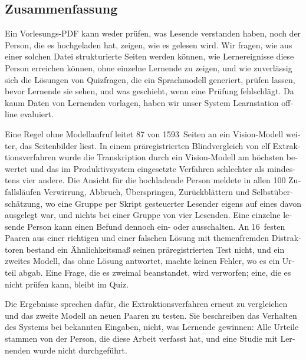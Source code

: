 \begin{otherlanguage}{ngerman}
\chapter*{Zusammenfassung}

Ein Vorlesungs-PDF kann weder prüfen, was Lesende verstanden haben, noch der
Person, die es hochgeladen hat, zeigen, wie es gelesen wird. Wir fragen, wie
aus einer solchen Datei strukturierte Seiten werden können, wie
Lernereignisse diese Person erreichen können, ohne einzelne Lernende zu
zeigen, und wie zuverlässig sich die Lösungen von Quizfragen, die ein
Sprachmodell generiert, prüfen lassen, bevor Lernende sie sehen, und was
geschieht, wenn eine Prüfung fehlschlägt. Da kaum Daten von Lernenden
vorlagen, haben wir unser System Learnstation offline evaluiert.

Eine Regel ohne Modellaufruf leitet 87 von 1593~Seiten an ein Vision-Modell
weiter, das Seitenbilder liest. In einem präregistrierten Blindvergleich von
elf Extraktionsverfahren wurde die Transkription durch ein Vision-Modell am
höchsten bewertet und das im Produktivsystem eingesetzte Verfahren schlechter
als mindestens vier andere. Die Ansicht für die hochladende Person meldete in
allen 100 Zufallsläufen Verwirrung, Abbruch, Überspringen, Zurückblättern und
Selbstüberschätzung, wo eine Gruppe per Skript gesteuerter Lesender eigens auf
eines davon ausgelegt war, und nichts bei einer Gruppe von vier Lesenden.
Eine einzelne lesende Person kann einen Befund dennoch ein- oder ausschalten.
An 16~festen Paaren aus einer richtigen und einer falschen Lösung mit
themenfremden Distraktoren bestand ein Ähnlichkeitsmaß seinen
präregistrierten Test nicht, und ein zweites Modell, das ohne Lösung
antwortet, machte keinen Fehler, wo es ein Urteil abgab. Eine Frage, die es
zweimal beanstandet, wird verworfen; eine, die es nicht prüfen kann, bleibt
im Quiz.

Die Ergebnisse sprechen dafür, die Extraktionsverfahren erneut zu vergleichen
und das zweite Modell an neuen Paaren zu testen. Sie beschreiben das Verhalten
des Systems bei bekannten Eingaben, nicht, was Lernende gewinnen: Alle Urteile stammen von
der Person, die diese Arbeit verfasst hat, und eine Studie mit Lernenden wurde
nicht durchgeführt.
\end{otherlanguage}
